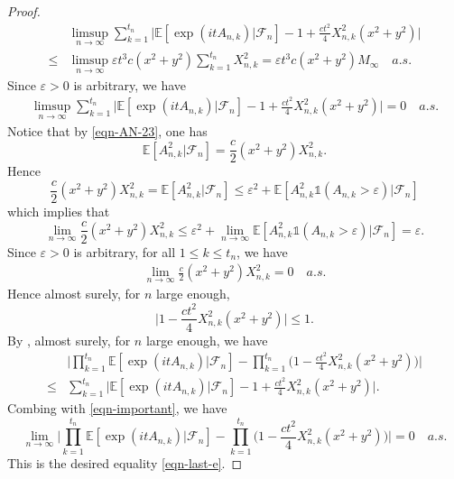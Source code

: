 \documentclass[12pt]{amsart}
\theoremstyle{definition}
\theoremstyle{remark}
\numberwithin{equation}{section}
\begin{document}
\begin{proof}
\begin{align*}
&\limsup_{n\rightarrow\infty}\sum_{k=1}^{t_n}\big|\mathbb{E}[\exp(itA_{n,k}) | \mathcal{F}_n]-1+\frac{ct^2}{4} X_{n,k}^2 (x^2+y^2)\big|\\
\leq &\limsup_{n\rightarrow\infty}\varepsilon t^3 c(x^2+y^2)\sum_{k=1}^{t_n} X_{n,k}^2
=\varepsilon t^3 c(x^2+y^2)M_\infty \quad a.s.
\end{align*}
Since $\varepsilon>0$ is arbitrary, we have 
\begin{align}\label{eqn-important}
\limsup_{n\rightarrow\infty}\sum_{k=1}^{t_n}\big|\mathbb{E}[\exp(itA_{n,k}) | \mathcal{F}_n]-1+\frac{ct^2}{4} X_{n,k}^2 (x^2+y^2)\big|=0 \quad a.s.
\end{align}
Notice that by \eqref{eqn-AN-23}, one has
\[
\mathbb{E}[A_{n,k}^2 |\mathcal{F}_n]=\frac{c}{2}(x^2+y^2)X_{n,k}^2.
\]
Hence
\[
\frac{c}{2}(x^2+y^2)X_{n,k}^2=\mathbb{E}[A_{n,k}^2| \mathcal{F}_n]\leq \varepsilon^2+\mathbb{E}\left[A_{n,k}^2\mathds{1}(A_{n,k}>\varepsilon)| \mathcal{F}_n\right]
\]
which implies that 
\[
\lim_{n\rightarrow\infty}\frac{c}{2}(x^2+y^2)X_{n,k}^2\leq \varepsilon^2+\lim_{n\rightarrow\infty}\mathbb{E}\left[A_{n,k}^2\mathds{1}(A_{n,k}>\varepsilon) | \mathcal{F}_n\right]=\varepsilon.
\]
Since $\varepsilon>0$ is arbitrary,   for all $1\leq k\leq t_n$, we have
\begin{align}\label{eqn-jijiji}
\lim_{n\rightarrow\infty}\frac{c}{2}(x^2+y^2)X_{n,k}^2=0 \quad  a.s.
\end{align}
Hence almost surely, for $n$ large enough,
\[
\Big|1-\frac{ct^2}{4} X_{n,k}^2 (x^2+y^2)\Big|\leq 1. 
\] 
By    \cite[Lemma 3.4.3]{Rick-Durrett}, almost surely, for $n$ large enough, we have 
\begin{align*}
& \Big|\prod_{k=1}^{t_n}\mathbb{E}[\exp(itA_{n,k})|\mathcal{F}_n]-\prod_{k=1}^{t_n}\Big(1-\frac{ct^2}{4} X_{n,k}^2 (x^2+y^2)\Big)\Big|
\\
\leq & \sum_{k=1}^{t_n}\Big|\mathbb{E}[\exp(itA_{n,k}) | \mathcal{F}_n]-1+\frac{ct^2}{4} X_{n,k}^2 (x^2+y^2)\Big|.
\end{align*}
Combing with  \eqref{eqn-important}, we have
\[
\lim_{n\rightarrow\infty }\Big|\prod_{k=1}^{t_n}\mathbb{E}[\exp( itA_{n,k}) |\mathcal{F}_n]-\prod_{k=1}^{t_n}\Big(1-\frac{ct^2}{4} X_{n,k}^2 (x^2+y^2)\Big)\Big|=0 \quad a.s. 
\]
This is the desired equality \eqref{eqn-last-e}.
\end{proof}


%
%
\end{document}
